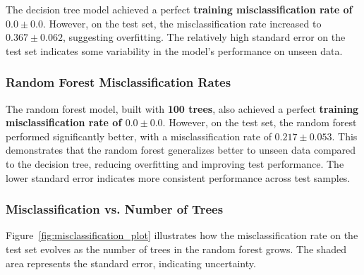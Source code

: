 \documentclass[fleqn,moreauthors,10pt]{ds_report}
\begin{document}
The decision tree model achieved a perfect \textbf{training misclassification rate of \(0.0 \pm 0.0\)}. However, on the test set, the misclassification rate increased to \(\mathbf{0.367 \pm 0.062}\), suggesting overfitting. The relatively high standard error on the test set indicates some variability in the model's performance on unseen data.


\subsubsection*{Random Forest Misclassification Rates}

The random forest model, built with \textbf{100 trees}, also achieved a perfect \textbf{training misclassification rate of \(0.0 \pm 0.0\)}. However, on the test set, the random forest performed significantly better, with a misclassification rate of \(\mathbf{0.217 \pm 0.053}\). This demonstrates that the random forest generalizes better to unseen data compared to the decision tree, reducing overfitting and improving test performance. The lower standard error indicates more consistent performance across test samples.


\subsubsection*{Misclassification vs. Number of Trees}


Figure~\ref{fig:misclassification_plot} illustrates how the misclassification rate on the test set evolves as the number of trees in the random forest grows. The shaded area represents the standard error, indicating uncertainty.
\end{document}
